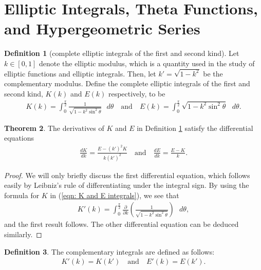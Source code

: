 \documentclass[11pt]{amsart}
\theoremstyle{definition}
\newtheorem{theorem}{Theorem}[section]
\numberwithin{theorem}{section}
\newtheorem{definition}[theorem]{Definition}
\begin{document}
\section{Elliptic Integrals, Theta Functions, and Hypergeometric Series}
\noindent \begin{definition}[complete elliptic integrals of the first and second kind]\label{definition: complete elliptic integrals of the first and second kind}
Let $k\in\left[0,1\right]$ denote the elliptic modulus, which is a quantity used in the study of elliptic functions and elliptic integrals. Then, let $k'=\sqrt{1-k^2}$ be the complementary modulus. Define the complete elliptic integrals of the first and second kind, $K\left(k\right)$ and $E\left(k\right)$ respectively, to be \begin{align}\label{eqn: K and E integrals}
        K\left(k\right)=\int_{0}^{\frac{\pi}{2}}\frac{1}{\sqrt{1-k^2\operatorname{sin}^2\theta}}\text{ }d\theta\quad\text{and}\quad 
        E\left(k\right)=\int_{0}^{\frac{\pi}{2}}\sqrt{1-k^2\operatorname{sin}^2\theta}\text{ }d\theta.
    \end{align}
\end{definition}
\begin{theorem}\label{derivatives of K and E}
The derivatives of $K$ and $E$ in Definition \ref{definition: complete elliptic integrals of the first and second kind} satisfy the differential equations 
\begin{align*}
    \frac{dK}{dk}=\frac{E-\left(k'\right)^2K}{k\left(k'\right)^2}\quad\text{and}\quad 
    \frac{dE}{dk}=\frac{E-K}{k}.
\end{align*}
\end{theorem}
\begin{proof}
We will only briefly discuss the first differential equation, which follows easily by Leibniz's rule of differentiating under the integral sign. By using the formula for $K$ in (\ref{eqn: K and E integrals}), we see that \begin{align*}
 K'\left(k\right)=\int_{0}^{\frac{\pi}{2}}\frac{\partial}{\partial k}\left(\frac{1}{\sqrt{1-k^2\operatorname{sin}^2\theta}}\right)\text{ }d\theta,
\end{align*}
and the first result follows. The other differential equation can be deduced similarly.
\end{proof}
\begin{definition}\label{definition of complementary integral}
    The complementary integrals are defined as follows:
    \begin{align*}
        K'\left(k\right)=K\left(k'\right)\quad\text{and}\quad E'\left(k\right)=E\left(k'\right).
    \end{align*}
\end{definition}
\end{document}
